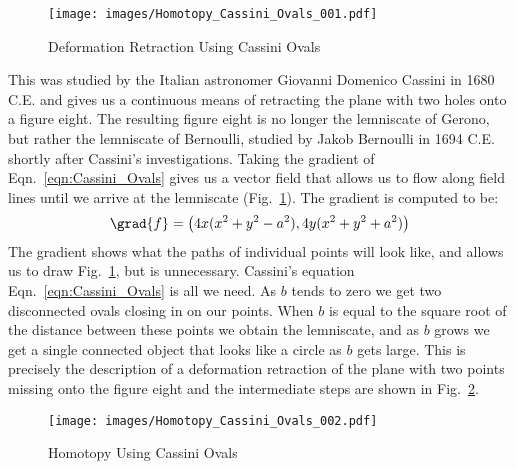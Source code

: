 \documentclass{book}                                                           %
\begin{document}
                \begin{figure}
                    \centering
                    \captionsetup{type=figure}
                    \texttt{[image: images/Homotopy\_Cassini\_Ovals\_001.pdf]}
                    \caption{Deformation Retraction Using Cassini Ovals}
                    \label{fig:Deformation_Retraction_Cassini_Ovals}
                \end{figure}
                This was studied by the Italian astronomer Giovanni Domenico
                Cassini in 1680 C.E. and gives us a continuous means of
                retracting the plane with two holes onto a figure eight. The
                resulting figure eight is no longer the lemniscate of Gerono,
                but rather the lemniscate of Bernoulli, studied by Jakob
                Bernoulli in 1694 C.E. shortly after Cassini's investigations.
                Taking the gradient of Eqn.~\ref{eqn:Cassini_Ovals} gives us a
                vector field that allows us to flow along field lines until we
                arrive at the lemniscate
                (Fig.~\ref{fig:Deformation_Retraction_Cassini_Ovals}). The
                gradient is computed to be:
                \begin{equation}
                    \grad{f}=\big(4x(x^{2}+y^{2}-a^{2}),4y(x^{2}+y^{2}+a^2)\big)
                \end{equation}
                The gradient shows what the paths of individual points will look
                like, and allows us to draw
                Fig.~\ref{fig:Deformation_Retraction_Cassini_Ovals}, but is
                unnecessary. Cassini's equation Eqn.~\ref{eqn:Cassini_Ovals} is
                all we need. As $b$ tends to zero we get two disconnected ovals
                closing in on our points. When $b$ is equal to the square root
                of the distance between these points we obtain the lemniscate,
                and as $b$ grows we get a single connected object that looks
                like a circle as $b$ gets large. This is precisely the
                description of a deformation retraction of the plane with two
                points missing onto the figure eight and the intermediate steps
                are shown in Fig.~\ref{fig:Homotopy_Cassini_Ovals}.
                \begin{figure}[H]
                    \centering
                    \captionsetup{type=figure}
                    \texttt{[image: images/Homotopy\_Cassini\_Ovals\_002.pdf]}
                    \caption{Homotopy Using Cassini Ovals}
                    \label{fig:Homotopy_Cassini_Ovals}
                \end{figure}
\end{document}
